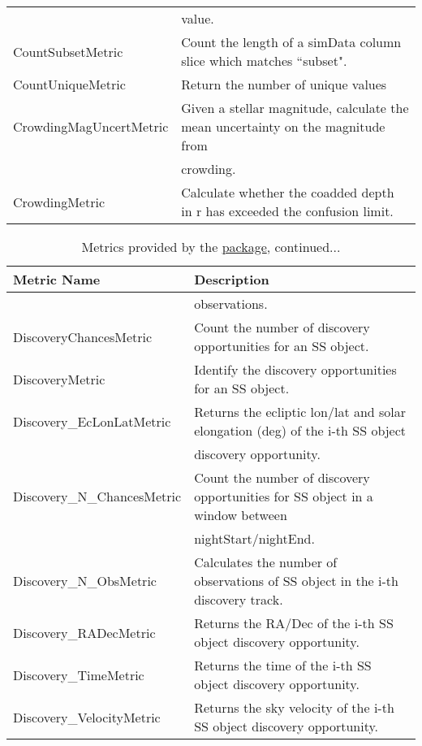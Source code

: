 \begin{table}[!h]
\begin{tabular}{ll}
  &  value. \\
 CountSubsetMetric &  Count the length of a simData column slice which matches ``subset". \\
 CountUniqueMetric &  Return the number of unique values \\
 CrowdingMagUncertMetric &  Given a stellar magnitude, calculate the mean uncertainty on the magnitude from \\
  &  crowding. \\
 CrowdingMetric &  Calculate whether the coadded depth in r has exceeded the confusion limit. \\
\end{tabular}
\end{table}

\begin{table}[!t]
\scriptsize
\setcounter{table}{0}
\makeatletter
\renewcommand{\thetable}{A.\arabic{table}}
\caption{Metrics provided by the
\href{https://github.com/lsst/sims_maf/tree/master/python/lsst/sims/maf}{\MAF package}, continued...}
\medskip
\begin{tabular}{ll}
\hline
            Metric Name &                                                                       Description \\
\hline\hline
  &  observations. \\
 DiscoveryChancesMetric &  Count the number of discovery opportunities  for an SS object. \\
 DiscoveryMetric &  Identify the discovery opportunities for an SS object. \\
 Discovery\_EcLonLatMetric &  Returns the ecliptic lon/lat and solar elongation (deg) of the i-th SS object \\
  &  discovery opportunity. \\
 Discovery\_N\_ChancesMetric &  Count the number of discovery opportunities for SS object in a window between \\
  &  nightStart/nightEnd. \\
 Discovery\_N\_ObsMetric &  Calculates the number of observations of SS object in the i-th discovery track. \\
 Discovery\_RADecMetric &  Returns the RA/Dec of the i-th SS object discovery opportunity. \\
 Discovery\_TimeMetric &  Returns the time of the i-th SS object discovery opportunity. \\
 Discovery\_VelocityMetric &  Returns the sky velocity of the i-th SS object discovery opportunity. \\

\end{tabular}
\end{table}
